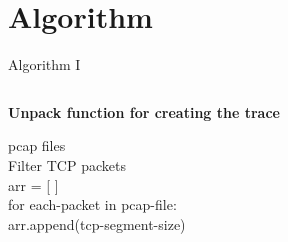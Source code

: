 \documentclass{beamer}
\begin{document}
\section{Algorithm}
\begin{frame}{Algorithm I}
    \begin{columns}
        \begin{column}{0.5\textwidth}
            \begin{algorithm}
            \scriptsize
            \hline
            \caption{\textbf{Unpack function for creating the trace}}\label{alg:cap}
            \hline
            \begin{algorithmic}
            \Require pcap files
            \\
              \hspace{1em} Filter TCP packets \\
              \hspace{1em} arr = [ ] \\ 
              \hspace{1em} for each-packet in pcap-file: \\
              \hspace{2em}  arr.append(tcp-segment-size)
            \end{algorithmic}
        \end{algorithm}
        \hline
        

\end{column}
\end{columns}
\end{frame}
\end{document}
